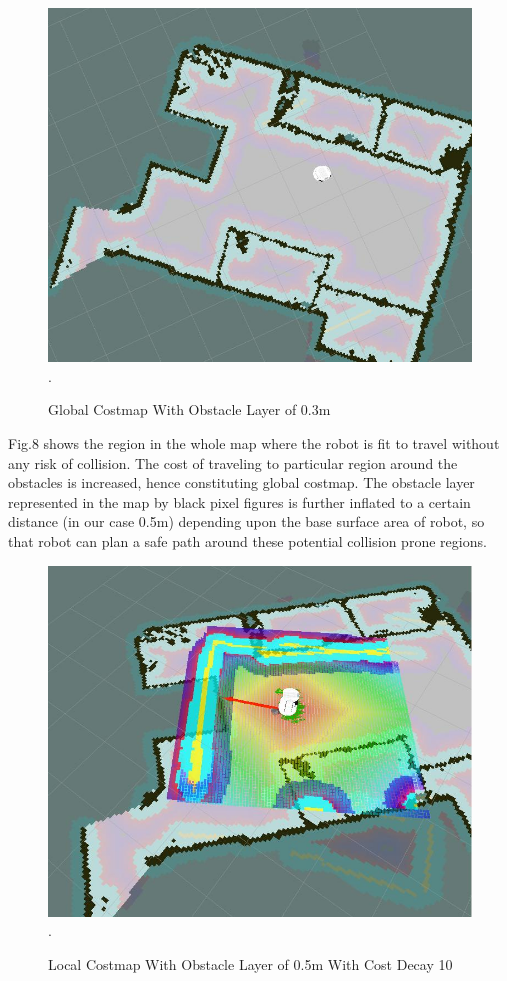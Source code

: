 \documentclass[journal,twoside]{IEEEtran}
\begin{document}
\begin{figure}[h!]
\centering
\includegraphics[scale=.32]{8.jpg}
\DeclareGraphicsExtensions.
\caption{Global Costmap With Obstacle Layer of 0.3m}
\end{figure}
\par\noindent Fig.8 shows the region in the whole map where the robot is fit to travel without any risk of collision. The cost of traveling to particular region around the obstacles is increased, hence constituting global costmap. The obstacle layer represented in the map by black pixel figures is further inflated to a certain distance (in our case 0.5m) depending upon the base surface area of robot, so that robot can plan a safe path around these potential collision prone regions. 
\begin{figure}[h]
\centering
\includegraphics[scale=.27]{9.jpg}
\DeclareGraphicsExtensions.
\caption{Local Costmap With Obstacle Layer of 0.5m With Cost Decay 10}
\end{figure}
\end{document}
